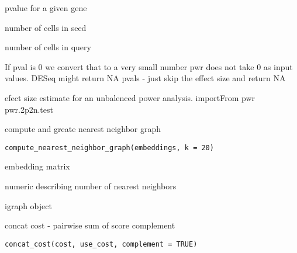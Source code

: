 \documentclass[a4paper]{book}
\begin{document}
%
\begin{Arguments}
\begin{ldescription}
\item[\code{pval}] pvalue for a given gene

\item[\code{seed}] number of cells in seed

\item[\code{query}] number of cells in query
\end{ldescription}
\end{Arguments}
%
\begin{Details}
If pval is 0 we convert that to a very small number
pwr does not take 0 as input values.
DESeq might return NA pvals - just skip the effect size and 
return NA
\end{Details}
%
\begin{Value}
efect size estimate for an unbalenced 
power analysis.
importFrom pwr pwr.2p2n.test
\end{Value}
%
\begin{Description}
compute and greate nearest neighbor graph
\end{Description}
%
\begin{Usage}
\begin{verbatim}
compute_nearest_neighbor_graph(embeddings, k = 20)
\end{verbatim}
\end{Usage}
%
\begin{Arguments}
\begin{ldescription}
\item[\code{embeddings}] embedding matrix

\item[\code{k}] numeric describing number of nearest neighbors
\end{ldescription}
\end{Arguments}
%
\begin{Value}
igraph object
\end{Value}
%
\begin{Description}
concat cost - pairwise sum of score complement
\end{Description}
%
\begin{Usage}
\begin{verbatim}
concat_cost(cost, use_cost, complement = TRUE)
\end{verbatim}
\end{Usage}
\end{document}

